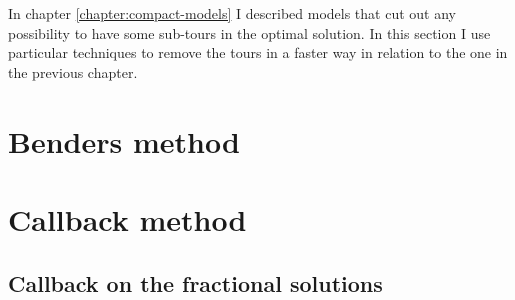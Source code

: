 In chapter \ref{chapter:compact-models} I described models that cut out any possibility to have some sub-tours in the optimal solution. In this section I use particular techniques to remove the tours in a faster way in relation to the one in the previous chapter.

\section{Benders method}
\label{chapter:benders}


\section{Callback method}
\label{chapter:callback}


\subsection{Callback on the fractional solutions}
\label{chapter:callback-fractional}
